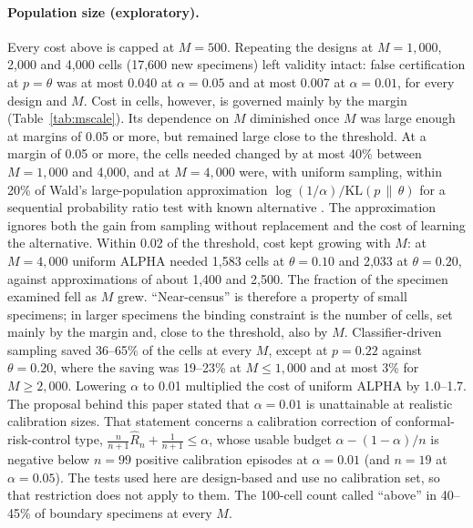 \documentclass[11pt]{article}
\theoremstyle{remark}
\theoremstyle{definition}
\begin{document}
\paragraph{Population size (exploratory).} Every cost above is capped at $M=500$. Repeating the designs at $M=1{,}000$, 2,000 and 4,000 cells (17,600 new specimens) left validity intact: false certification at $p=\theta$ was at most 0.040 at $\alpha=0.05$ and at most 0.007 at $\alpha=0.01$, for every design and $M$. Cost in cells, however, is governed mainly by the margin (Table~\ref{tab:mscale}). Its dependence on $M$ diminished once $M$ was large enough at margins of 0.05 or more, but remained large close to the threshold. At a margin of 0.05 or more, the cells needed changed by at most 40\% between $M=1{,}000$ and 4,000, and at $M=4{,}000$ were, with uniform sampling, within 20\% of Wald's large-population approximation $\log(1/\alpha)/\mathrm{KL}(p\,\|\,\theta)$ for a sequential probability ratio test with known alternative \cite{wald1945}. The approximation ignores both the gain from sampling without replacement and the cost of learning the alternative. Within 0.02 of the threshold, cost kept growing with $M$: at $M=4{,}000$ uniform ALPHA needed 1,583 cells at $\theta=0.10$ and 2,033 at $\theta=0.20$, against approximations of about 1,400 and 2,500. The fraction of the specimen examined fell as $M$ grew. ``Near-census'' is therefore a property of small specimens; in larger specimens the binding constraint is the number of cells, set mainly by the margin and, close to the threshold, also by $M$. Classifier-driven sampling saved 36--65\% of the cells at every $M$, except at $p=0.22$ against $\theta=0.20$, where the saving was 19--23\% at $M\le1{,}000$ and at most 3\% for $M\ge2{,}000$. Lowering $\alpha$ to 0.01 multiplied the cost of uniform ALPHA by 1.0--1.7. The proposal behind this paper stated that $\alpha=0.01$ is unattainable at realistic calibration sizes. That statement concerns a calibration correction of conformal-risk-control type, $\tfrac{n}{n+1}\hat R_n+\tfrac{1}{n+1}\le\alpha$, whose usable budget $\alpha-(1-\alpha)/n$ is negative below $n=99$ positive calibration episodes at $\alpha=0.01$ (and $n=19$ at $\alpha=0.05$). The tests used here are design-based and use no calibration set, so that restriction does not apply to them. The 100-cell count called ``above'' in 40--45\% of boundary specimens at every $M$.
\end{document}
